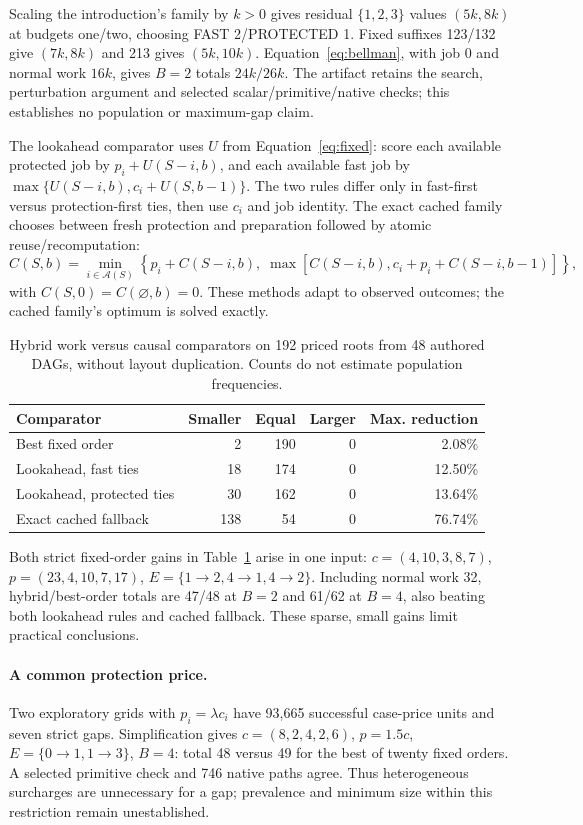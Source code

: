 \documentclass[acmsmall,screen,review,anonymous]{acmart}
\begin{document}
Scaling the introduction's family by $k>0$ gives residual $\{1,2,3\}$ values $(5k,8k)$ at budgets one/two, choosing FAST 2/PROTECTED 1. Fixed suffixes 123/132 give $(7k,8k)$ and 213 gives $(5k,10k)$. Equation~\eqref{eq:bellman}, with job 0 and normal work $16k$, gives $B=2$ totals $24k/26k$. The artifact retains the search, perturbation argument and selected scalar/primitive/native checks; this establishes no population or maximum-gap claim.

The lookahead comparator uses $U$ from Equation~\eqref{eq:fixed}: score each available protected job by $p_i+U(S-i,b)$, and each available fast job by $\max\{U(S-i,b),c_i+U(S,b-1)\}$. The two rules differ only in fast-first versus protection-first ties, then use $c_i$ and job identity. The exact cached family chooses between fresh protection and preparation followed by atomic reuse/recomputation:
\[
 C(S,b)=\min_{i\in\mathcal A(S)}\left\{
 p_i+C(S-i,b),\;
 \max[C(S-i,b),c_i+p_i+C(S-i,b-1)]\right\},
\]
with $C(S,0)=C(\varnothing,b)=0$. These methods adapt to observed outcomes; the cached family's optimum is solved exactly.

\begin{table}[t]
\caption{Hybrid work versus causal comparators on 192 priced roots from 48 authored DAGs, without layout duplication. Counts do not estimate population frequencies.}
\label{tab:nativefinal}
\centering
\begin{tabular}{lrrrr}
\toprule
Comparator & Smaller & Equal & Larger & Max. reduction\\
\midrule
Best fixed order &2&190&0&2.08\%\\
Lookahead, fast ties &18&174&0&12.50\%\\
Lookahead, protected ties &30&162&0&13.64\%\\
Exact cached fallback &138&54&0&76.74\%\\
\bottomrule
\end{tabular}
\end{table}

Both strict fixed-order gains in Table~\ref{tab:nativefinal} arise in one input: $c=(4,10,3,8,7)$, $p=(23,4,10,7,17)$, $E=\{1\to2,4\to1,4\to2\}$. Including normal work 32, hybrid/best-order totals are 47/48 at $B=2$ and 61/62 at $B=4$, also beating both lookahead rules and cached fallback. These sparse, small gains limit practical conclusions.

\paragraph{A common protection price.}
Two exploratory grids with $p_i=\lambda c_i$ have 93,665 successful case-price units and seven strict gaps. Simplification gives $c=(8,2,4,2,6)$, $p=1.5c$, $E=\{0\to1,1\to3\}$, $B=4$: total 48 versus 49 for the best of twenty fixed orders. A selected primitive check and 746 native paths agree. Thus heterogeneous surcharges are unnecessary for a gap; prevalence and minimum size within this restriction remain unestablished.
\end{document}
